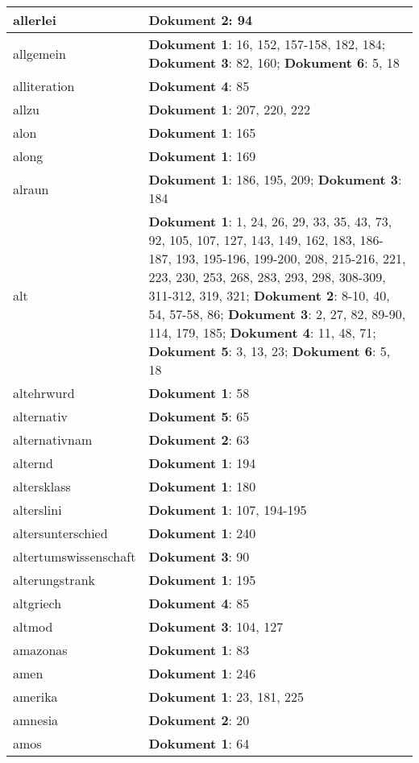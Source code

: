 \documentclass[a5paper]{article}
\begin{document}
\begin{longtable}[l]{|l|p{3in}|}
\hline
allerlei & \textbf{Dokument 2}: 94 \\
\hline
allgemein & \textbf{Dokument 1}: 16, 152, 157-158, 182, 184; \textbf{Dokument 3}: 82, 160; \textbf{Dokument 6}: 5, 18 \\
\hline
alliteration & \textbf{Dokument 4}: 85 \\
\hline
allzu & \textbf{Dokument 1}: 207, 220, 222 \\
\hline
alon & \textbf{Dokument 1}: 165 \\
\hline
along & \textbf{Dokument 1}: 169 \\
\hline
alraun & \textbf{Dokument 1}: 186, 195, 209; \textbf{Dokument 3}: 184 \\
\hline
alt & \textbf{Dokument 1}: 1, 24, 26, 29, 33, 35, 43, 73, 92, 105, 107, 127, 143, 149, 162, 183, 186-187, 193, 195-196, 199-200, 208, 215-216, 221, 223, 230, 253, 268, 283, 293, 298, 308-309, 311-312, 319, 321; \textbf{Dokument 2}: 8-10, 40, 54, 57-58, 86; \textbf{Dokument 3}: 2, 27, 82, 89-90, 114, 179, 185; \textbf{Dokument 4}: 11, 48, 71; \textbf{Dokument 5}: 3, 13, 23; \textbf{Dokument 6}: 5, 18 \\
\hline
altehrwurd & \textbf{Dokument 1}: 58 \\
\hline
alternativ & \textbf{Dokument 5}: 65 \\
\hline
alternativnam & \textbf{Dokument 2}: 63 \\
\hline
alternd & \textbf{Dokument 1}: 194 \\
\hline
altersklass & \textbf{Dokument 1}: 180 \\
\hline
alterslini & \textbf{Dokument 1}: 107, 194-195 \\
\hline
altersunterschied & \textbf{Dokument 1}: 240 \\
\hline
altertumswissenschaft & \textbf{Dokument 3}: 90 \\
\hline
alterungstrank & \textbf{Dokument 1}: 195 \\
\hline
altgriech & \textbf{Dokument 4}: 85 \\
\hline
altmod & \textbf{Dokument 3}: 104, 127 \\
\hline
amazonas & \textbf{Dokument 1}: 83 \\
\hline
amen & \textbf{Dokument 1}: 246 \\
\hline
amerika & \textbf{Dokument 1}: 23, 181, 225 \\
\hline
amnesia & \textbf{Dokument 2}: 20 \\
\hline
amos & \textbf{Dokument 1}: 64 \\
\hline

\end{longtable}
\end{document}
